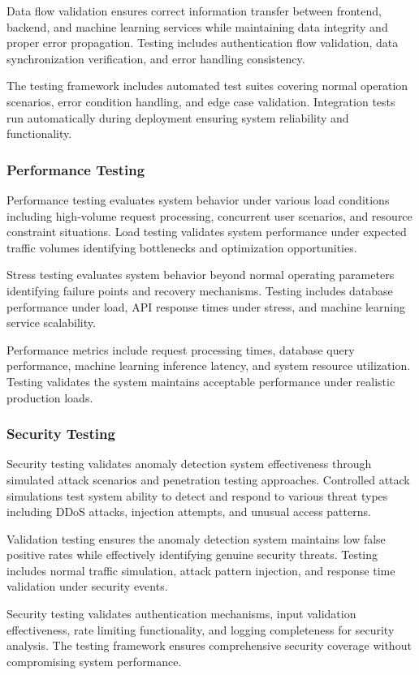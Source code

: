 \documentclass[12pt]{article}
\begin{document}
Data flow validation ensures correct information transfer between frontend, backend, and machine learning services while maintaining data integrity and proper error propagation. Testing includes authentication flow validation, data synchronization verification, and error handling consistency.

The testing framework includes automated test suites covering normal operation scenarios, error condition handling, and edge case validation. Integration tests run automatically during deployment ensuring system reliability and functionality.

\subsubsection{Performance Testing}
Performance testing evaluates system behavior under various load conditions including high-volume request processing, concurrent user scenarios, and resource constraint situations. Load testing validates system performance under expected traffic volumes identifying bottlenecks and optimization opportunities.

Stress testing evaluates system behavior beyond normal operating parameters identifying failure points and recovery mechanisms. Testing includes database performance under load, API response times under stress, and machine learning service scalability.

Performance metrics include request processing times, database query performance, machine learning inference latency, and system resource utilization. Testing validates the system maintains acceptable performance under realistic production loads.

\subsubsection{Security Testing}
Security testing validates anomaly detection system effectiveness through simulated attack scenarios and penetration testing approaches. Controlled attack simulations test system ability to detect and respond to various threat types including DDoS attacks, injection attempts, and unusual access patterns.

Validation testing ensures the anomaly detection system maintains low false positive rates while effectively identifying genuine security threats. Testing includes normal traffic simulation, attack pattern injection, and response time validation under security events.

Security testing validates authentication mechanisms, input validation effectiveness, rate limiting functionality, and logging completeness for security analysis. The testing framework ensures comprehensive security coverage without compromising system performance.
\end{document}
